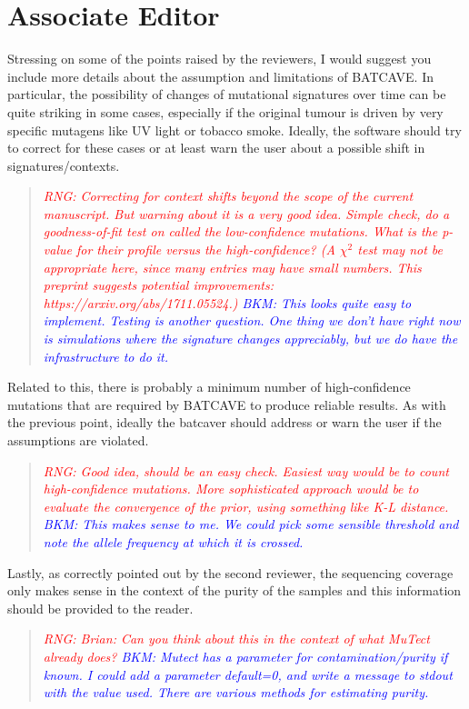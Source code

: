 \documentclass[11pt]{article}
\newcommand{\BKM}[1]{\textcolor{blue}{BKM: #1}}
\newcommand{\RNG}[1]{\textcolor{red}{RNG: #1}}
\newenvironment{response}
{\begin{quote}\itshape}
{\end{quote}}
\begin{document}
\section*{Associate Editor}

Stressing on some of the points raised by the reviewers, I would suggest you include more details about the assumption and limitations of BATCAVE. In particular, the possibility of changes of mutational signatures over time can be quite striking in some cases, especially if the original tumour is driven by very specific mutagens like UV light or tobacco smoke. Ideally, the software should try to correct for these cases or at least warn the user about a possible shift in signatures/contexts.
\begin{response}
\RNG{Correcting for context shifts beyond the scope of the current manuscript. But warning about it is a very good idea. Simple check, do a goodness-of-fit test on called the low-confidence mutations. What is the p-value for their profile versus the high-confidence? (A $\chi^2$ test may not be appropriate here, since many entries may have small numbers. This preprint suggests potential improvements: https://arxiv.org/abs/1711.05524.)}
\BKM{This looks quite easy to implement. Testing is another question. One thing we don't have right now is simulations where the signature changes appreciably, but we do have the infrastructure to do it.}
\end{response}

Related to this, there is probably a minimum number of high-confidence mutations that are required by BATCAVE to produce reliable results. As with the previous point, ideally the batcaver should address or warn the user if the assumptions are violated.
\begin{response}
\RNG{Good idea, should be an easy check. Easiest way would be to count high-confidence mutations. More sophisticated approach would be to evaluate the convergence of the prior, using something like K-L distance.}
\BKM{This makes sense to me. We could pick some sensible threshold and note the allele frequency at which it is crossed.}
\end{response}

Lastly, as correctly pointed out by the second reviewer, the sequencing coverage only makes sense in the context of the purity of the samples and this information should be provided to the reader.
\begin{response}
\RNG{Brian: Can you think about this in the context of what MuTect already does?}
\BKM{Mutect has a parameter for contamination/purity if known. I could add a parameter default=0, and write a message to stdout with the value used. There are various methods for estimating purity.}
\end{response}
\end{document}

